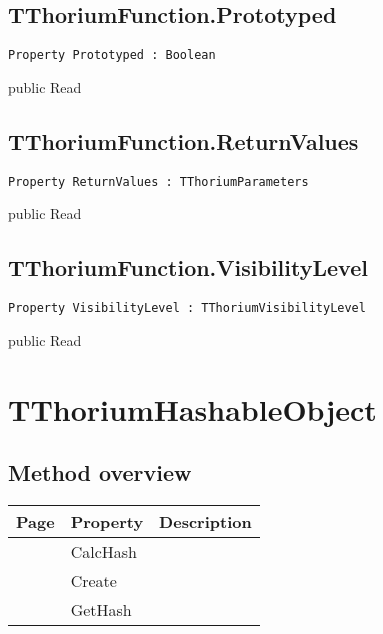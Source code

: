\subsection{TThoriumFunction.Prototyped}
\label{thoriumcore:thorium:tthoriumfunction:prototyped}
\begin{FPCList}
\Synopsis
\Declaration 

\begin{verbatim}
Property Prototyped : Boolean
\end{verbatim}
\Visibility
public
\Access
Read
\Description
\end{FPCList}
\subsection{TThoriumFunction.ReturnValues}
\label{thoriumcore:thorium:tthoriumfunction:returnvalues}
\begin{FPCList}
\Synopsis
\Declaration 

\begin{verbatim}
Property ReturnValues : TThoriumParameters
\end{verbatim}
\Visibility
public
\Access
Read
\Description
\end{FPCList}
\subsection{TThoriumFunction.VisibilityLevel}
\label{thoriumcore:thorium:tthoriumfunction:visibilitylevel}
\begin{FPCList}
\Synopsis
\Declaration 

\begin{verbatim}
Property VisibilityLevel : TThoriumVisibilityLevel
\end{verbatim}
\Visibility
public
\Access
Read
\Description
\end{FPCList}
\section{TThoriumHashableObject}
\label{thoriumcore:thorium:tthoriumhashableobject}
\subsection{Method overview}
\label{thoriumcore:thorium:tthoriumhashableobject:methods}
\begin{tabularx}{\textwidth}{llX}
Page & Property & Description  \\ \hline
\pageref{thoriumcore:thorium:tthoriumhashableobject:calchash} & CalcHash  &  \\
\pageref{thoriumcore:thorium:tthoriumhashableobject:create} & Create  &  \\
\pageref{thoriumcore:thorium:tthoriumhashableobject:gethash} & GetHash  &  \\
\hline
\end{tabularx}
